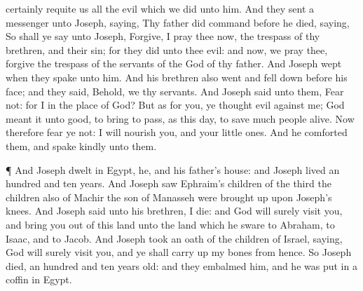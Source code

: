 {certainly
requite us all the
evil which we
did unto him.
And they sent a
messenger unto
Joseph,
saying, Thy
father did
command
before he
died,
saying,
So shall ye
say unto
Joseph,
Forgive, I pray
thee now, the
trespass of thy
brethren, and their
sin; for they
did unto thee
evil: and now, we pray thee,
forgive the
trespass of the
servants of the
God of thy
father. And
Joseph
wept when they
spake unto him.
And his
brethren also
went and fell
down before his
face; and they
said, Behold, we
{} thy
servants.
And
Joseph
said unto them,
Fear not: for
{} I in the place of
God?
But as for you, ye
thought
evil against me;
{}
God meant
it unto
good,
to bring to
pass, as
{} this
day, to
save
much
people
alive.
Now therefore
fear ye not: I will
nourish you, and your little
ones. And he
comforted them, and
spake
kindly unto them.
\par }{\PP {}¶ And
Joseph
dwelt in
Egypt, he, and his
father’s
house: and
Joseph
lived an
hundred and
ten
years.
And
Joseph
saw
Ephraim’s
children of the
third
{} the
children also of
Machir the
son of
Manasseh were brought
up upon
Joseph’s
knees.
And
Joseph
said unto his
brethren, I
die: and
God will
surely
visit you, and bring you
out of this
land unto the
land which he
sware to
Abraham, to
Isaac, and to
Jacob.
And
Joseph took an
oath of the
children of
Israel,
saying,
God will
surely
visit you, and ye shall carry
up my
bones from
hence.
So
Joseph
died,
{} an
hundred and
ten
years
old: and they
embalmed him, and he was
put in a
coffin in
Egypt.
\par }